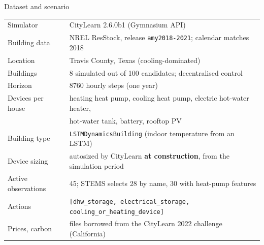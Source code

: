 \documentclass[aspectratio=169,10pt]{beamer}
\begin{document}
\begin{frame}{Dataset and scenario}
\centering
\small
\begin{tabular}{@{}ll@{}}
\toprule
Simulator & CityLearn 2.6.0b1 (Gymnasium API) \\
Building data & NREL ResStock, release \texttt{amy2018-2021}; calendar matches 2018 \\
Location & Travis County, Texas (cooling-dominated) \\
Buildings & 8 simulated out of 100 candidates; decentralised control \\
Horizon & 8760 hourly steps (one year) \\
Devices per house & heating heat pump, cooling heat pump, electric hot-water heater, \\
 & hot-water tank, battery, rooftop PV \\
Building type & \texttt{LSTMDynamicsBuilding} (indoor temperature from an LSTM) \\
Device sizing & autosized by CityLearn \textbf{at construction}, from the simulation period \\
Active observations & 45; STEMS selects 28 by name, 30 with heat-pump features \\
Actions & \texttt{[dhw\_storage, electrical\_storage, cooling\_or\_heating\_device]} \\
Prices, carbon & files borrowed from the CityLearn 2022 challenge (California) \\
\bottomrule
\end{tabular}
\end{frame}
\end{document}
